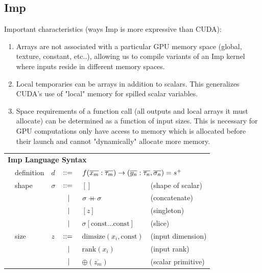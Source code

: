 \documentclass[preprint]{sigplanconf}
\begin{document}
\subsection{Imp}
Important characteristics (ways Imp is more expressive than CUDA):
\begin{enumerate}
\item  Arrays are not associated with a particular GPU memory space (global, texture, constant, etc..), allowing us to compile variants of an Imp kernel where inputs reside in different memory spaces. 
\item Local temporaries can be arrays in addition to scalars. This generalizes CUDA's use of "local" memory for spilled scalar variables. 
\item Space requirements of a function call (all outputs and local arrays it must allocate) can be determined as a function of input sizes. This is necessary for GPU computations only have access to memory which is allocated before their launch and cannot "dynamically" allocate more memory. 
\end{enumerate}
\begin{tabular}{m{0.1cm}m{1.2cm}m{0.1cm}m{0.2cm}p{2cm}p{2.7cm}}
 \multicolumn{6}{l}{\textbf{Imp Language Syntax}} \\[4pt]
& definition        & $d$      & $::=$ & 
      \multicolumn{2}{l}{$f(\overline{x_m} : \overline{\tau_m}) \rightarrow (\overline{y_n} : \overline{\tau_n}, \overline{\sigma_n}) = s^{\small{+}}$} \\[4pt]
& shape             & $\sigma$ & $::=$ & $ [] $                                            &  \quad \small{(shape of scalar)}      \\[2pt]
&                   &          & $\ \ | \ \ $    & $ \sigma +\!\!\!\!+\, \sigma $                         &  \quad \small{(concatenate)}      \\[2pt]
&                   &          & $\ \ | \ \ $    & $ [z] $                                           &  \quad \small{(singleton)}   \\[2pt]
&                   &          & $\ \ | \ \ $    & $ \sigma[\mathrm{const} \ldots  \mathrm{const}] $ &  \quad \small{(slice)}       \\[4pt]
& size              & $z$      & $::=$ & $ \mathrm{dimsize}(x_i, \mathrm{const}) $         &  \quad \small{(input dimension)}   \\[2pt]
&                   &          & $\ \ | \ \ $    & $ \mathrm{rank}(x_i) $                            &  \quad \small{(input rank)}  \\[2pt]
&                   &          & $\ \ | \ \ $    & $ \oplus(\overline{z_m})$                         &  \quad \small{(scalar primitive)}    \\[2pt]
\end{tabular}
\end{document}
